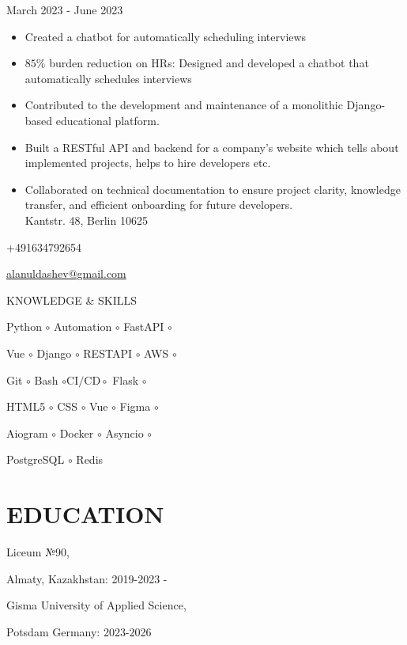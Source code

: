 \documentclass[10pt]{article}
\begin{document}
March 2023 - June 2023

\begin{itemize}
  \item Created a chatbot for automatically scheduling interviews
  \item $85 \%$ burden reduction on HRs: Designed and developed a chatbot that automatically schedules interviews
  \item Contributed to the development and maintenance of a monolithic Django-based educational platform.
  \item Built a RESTful API and backend for a company's website which tells about implemented projects, helps to hire developers etc.
  \item Collaborated on technical documentation to ensure project clarity, knowledge transfer, and efficient onboarding for future developers.\\
Kantstr. 48, Berlin 10625
\end{itemize}

+491634792654

\href{mailto:alanuldashev@gmail.com}{alanuldashev@gmail.com}

KNOWLEDGE \& SKILLS

Python $\circ$ Automation $\circ$ FastAPI $\circ$

Vue $\circ$ Django $\circ$ RESTAPI $\circ$ AWS $\circ$

Git $\circ$ Bash $\circ \mathrm{CI} / \mathrm{CD} \circ$ Flask $\circ$

HTML5 $\circ$ CSS $\circ$ Vue $\circ$ Figma $\circ$

Aiogram $\circ$ Docker $\circ$ Asyncio $\circ$

PostgreSQL $\circ$ Redis

\section*{EDUCATION}
Liceum №90,

Almaty, Kazakhstan: 2019-2023 -

Gisma University of Applied Science,

Potsdam Germany: 2023-2026
\end{document}
